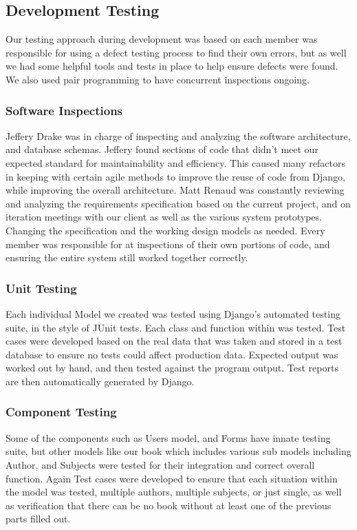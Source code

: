 \documentclass[11pt]{article}
\begin{document}
	\subsection{Development Testing}

		Our testing approach during development was based on each member was responsible for using a defect testing process to find their own errors, but as well we had some helpful tools and tests in place to help ensure defects were found. 
		We also used pair programming to have concurrent inspections ongoing.

		\subsubsection{Software Inspections}
			Jeffery Drake was in charge of inspecting and analyzing the software architecture, and database schemas. 
			Jeffery found sections of code that didn't meet our expected standard for maintainability and efficiency. 
			This caused many refactors in keeping with certain agile methods to improve the reuse of code from Django, while improving the overall architecture.  
			Matt Renaud was constantly reviewing and analyzing the requirements specification based on the current project, and on iteration meetings with our client as well as the various system prototypes. 
			Changing the specification and the working design models as needed. 
			Every member was responsible for at inspections of their own portions of code, and ensuring the entire system still worked together correctly.
		\subsubsection{Unit Testing}

			Each individual Model we created was tested using Django's automated testing suite, in the style of JUnit tests. 
			Each class and function within was tested. 
			Test cases were developed based on the real data that was taken and stored in a test database to ensure no tests could affect production data. 
			Expected output was worked out by hand, and then tested against the program output. 
			Test reports are then automatically generated by Django. 

		\subsubsection{Component Testing}

			Some of the components such as Users model, and Forms have innate testing suite, but other models like our book which includes various sub models including Author, and Subjects were tested for their integration and correct overall function. 
			Again Test cases were developed to ensure that each situation within the model was tested, multiple authors, multiple subjects, or just single, as well as verification that there can be no book without at least one of the previous parts filled out.
\end{document}
